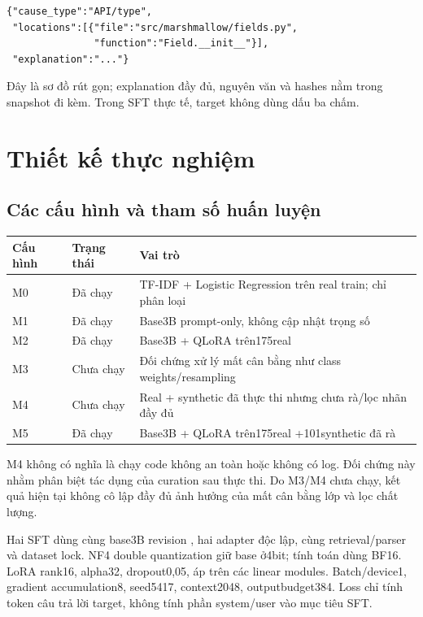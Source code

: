\documentclass[12pt,a4paper]{article}
\begin{document}
\begin{Verbatim}[fontsize=\small]
{"cause_type":"API/type",
 "locations":[{"file":"src/marshmallow/fields.py",
               "function":"Field.__init__"}],
 "explanation":"..."}
\end{Verbatim}
Đây là sơ đồ rút gọn; explanation đầy đủ, nguyên văn và hashes nằm trong snapshot đi kèm. Trong SFT thực tế, target không dùng dấu ba chấm.

\nextpage
\section{Thiết kế thực nghiệm}
\subsection{Các cấu hình và tham số huấn luyện}
\begin{center}\small
\begin{tabularx}{\linewidth}{llX}\toprule
Cấu hình & Trạng thái & Vai trò\\\midrule
M0 & Đã chạy & TF-IDF + Logistic Regression trên real train; chỉ phân loại\\
M1 & Đã chạy & Base3B prompt-only, không cập nhật trọng số\\
M2 & Đã chạy & Base3B + QLoRA trên175real\\
M3 & Chưa chạy & Đối chứng xử lý mất cân bằng như class weights/resampling\\
M4 & Chưa chạy & Real + synthetic đã thực thi nhưng chưa rà/lọc nhãn đầy đủ\\
M5 & Đã chạy & Base3B + QLoRA trên175real +101synthetic đã rà\\\bottomrule
\end{tabularx}\end{center}

M4 không có nghĩa là chạy code không an toàn hoặc không có log. Đối chứng này nhằm phân biệt tác dụng của curation sau thực thi. Do M3/M4 chưa chạy, kết quả hiện tại không cô lập đầy đủ ảnh hưởng của mất cân bằng lớp và lọc chất lượng.

Hai SFT dùng cùng base3B revision , hai adapter độc lập, cùng retrieval/parser và dataset lock. NF4 double quantization giữ base ở4bit; tính toán dùng BF16. LoRA rank16, alpha32, dropout0,05, áp trên các linear modules. Batch/device1, gradient accumulation8, seed5417, context2048, outputbudget384. Loss chỉ tính token câu trả lời target, không tính phần system/user vào mục tiêu SFT.
\end{document}
